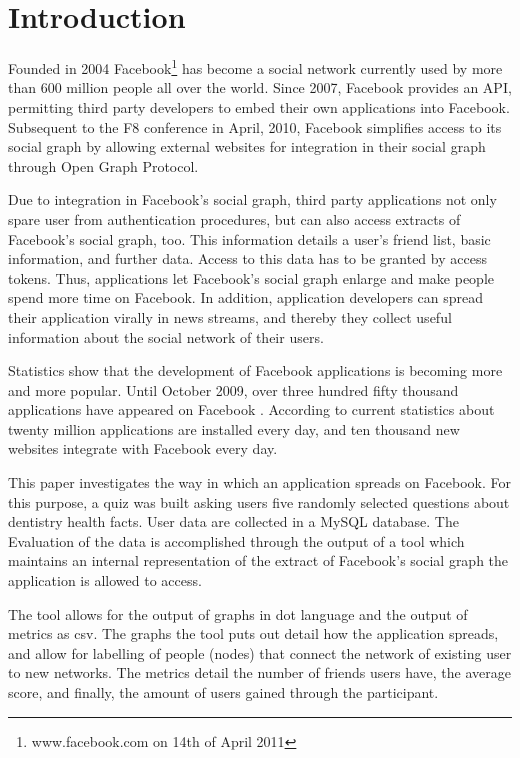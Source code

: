 \documentclass[preprint,12pt]{elsarticle}
\begin{document}
\section{Introduction}
\label{sec:introduction}
Founded in 2004 Facebook\footnote{www.facebook.com on 14th of April 2011} has
become a social network currently used by more than 600 million people
all over the world\cite{facebook500}. Since 2007, Facebook provides an API, permitting
third party developers to embed their own applications into
Facebook.
Subsequent to the F8 conference in April, 2010, Facebook simplifies
access to its social graph by allowing
external websites for integration in their social graph through Open
Graph Protocol.\cite{facebookStats} 

Due to integration in Facebook's social graph, third party
applications not only spare user from authentication procedures, but can also access
extracts of Facebook's social graph, too. This information details a
user's friend list, basic information, and 
further data. Access to this data has to be granted by access tokens. \cite{facebookDevAuth}
Thus, applications let Facebook's social graph enlarge and make people 
spend more time on Facebook. In addition, application developers
can spread their application virally in news
streams, and thereby they collect useful information about the social network of
their users.

Statistics show that the development of Facebook applications is becoming more
and more popular. Until October 2009, 
over three hundred fifty thousand applications have appeared on Facebook \cite{facebookBlog}.
According to current statistics about twenty million applications are
installed every day, and ten thousand new websites integrate with
Facebook every day. \cite{facebookStats} 

This paper investigates the way in which an application spreads on
Facebook. For this purpose, a quiz was built asking users five randomly
selected questions about dentistry health facts. User data are
collected in a MySQL database. The Evaluation of the data is
accomplished through the output of a tool which maintains an internal
representation of the extract of Facebook's 
social graph the application is allowed to access.

The tool allows for the output of graphs in \ac{dot} language and the output of
metrics as \ac{csv}. The graphs the tool puts out detail how the application
spreads, and allow for labelling of people (nodes) that connect the
network of existing user to new networks. The metrics detail the
number of friends users have, the average score,
and finally, the amount of users gained through the participant.
\end{document}
